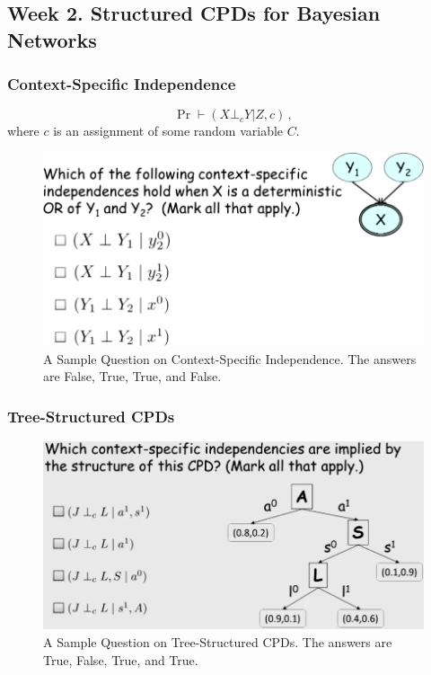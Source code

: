 \documentclass[12pt]{article}
\begin{document}
\subsection{Week 2. Structured CPDs for Bayesian Networks}

\subsubsection{Context-Specific Independence}
\begin{equation*}
  \Pr \vdash (X \bot_c Y | Z, c) \, ,
\end{equation*}
where $c$ is an assignment of some random variable $C$.

\begin{figure}[H]
\centering
\includegraphics[width=6in]{graphics/example_context_specific_independence.png}
\caption{A Sample Question on Context-Specific Independence.  The answers are False, True, True, and False.}
\label{fig:example_context_specific_independence}
\end{figure}

\subsubsection{Tree-Structured CPDs}

\begin{figure}[H]
\centering
\includegraphics[width=6in]{graphics/example_tree_structured_cpds.png}
\caption{A Sample Question on Tree-Structured CPDs.  The answers are True, False, True, and True.}
\label{fig:example_tree_structured_cpds}
\end{figure}
\end{document}
